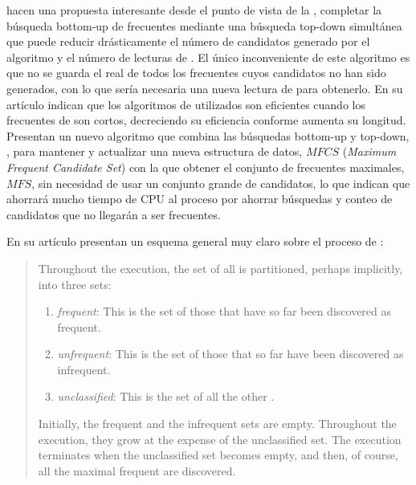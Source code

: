 

\citet{LinKedem-PincerSearchFIM-2002} hacen una propuesta interesante desde el punto de vista de la \fim, completar la búsqueda bottom-up de \itemsets frecuentes mediante una búsqueda top-down simultánea que puede reducir drásticamente el número de candidatos generado por el algoritmo y el número de lecturas de \D. El único inconveniente de este algoritmo es que no se guarda el \soporte real de todos los \itemsets frecuentes cuyos candidatos no han sido generados, con lo que sería necesaria una nueva lectura de \D para obtenerlo. En su artículo indican que los algoritmos de \ARM utilizados son eficientes cuando los \itemsets frecuentes de \D son cortos, decreciendo su eficiencia conforme aumenta su longitud.
Presentan un nuevo algoritmo que combina las búsquedas bottom-up  y top-down, %
, para mantener y actualizar una nueva estructura de datos, $MFCS$ (\textsl{Maximum Frequent Candidate Set}) con la que obtener el conjunto de \itemsets frecuentes maximales, $MFS$, sin necesidad de usar un conjunto grande de candidatos, lo que indican que ahorrará mucho tiempo de CPU al proceso por ahorrar búsquedas y conteo de candidatos que no llegarán a ser \itemsets frecuentes.

En su artículo presentan un esquema general muy claro sobre el proceso de \fim:

\begin{quote}
  Throughout the execution, the set of all \itemsets is partitioned, perhaps implicitly, into three sets:
  \begin{enumerate}
    \item \emph{frequent}: This is the set of those \itemsets that have so far been discovered as frequent.
    \item \emph{unfrequent}: This is the set of those \itemsets that so far have been discovered as infrequent.
    \item \emph{unclassified}: This is the set of all the other \itemsets.
  \end{enumerate}
  Initially, the frequent and the infrequent sets are empty. Throughout the execution, they grow at the expense of the unclassified set. The execution terminates when the unclassified set becomes empty, and then, of course, all the maximal frequent \itemsets are discovered.
\end{quote}

